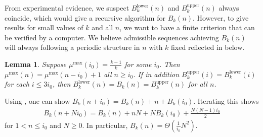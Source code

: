 \documentclass[11pt,reqno]{amsart}
\theoremstyle{plain}
\newtheorem{lemma}[theorem]{Lemma}
\theoremstyle{definition}
\theoremstyle{remark}
\numberwithin{equation}{section}
\numberwithin{equation}{section}
\newcommand{\up}{\textrm{upper}}
\newcommand{\low}{\textrm{lower}}
\begin{document}
From experimental evidence, we suspect $B_k^{\low}(n)$ and $B_k^{\up}(n)$ always coincide, which would give a recursive algorithm for $B_k(n)$. However, to give results for small values of $k$ and all $n$, we want to have a finite criterion that can be verified by a computer. We believe admissible sequences achieving $B_k(n)$ will always following a periodic structure in $n$ with $k$ fixed reflected in  below.
\begin{lemma}
\label{periodic}
Suppose $\mu^{\max}(i_0)=\frac{k-1}{k}$ for some $i_0$. Then $\mu^{\max}(n) = \mu^{\max}(n-i_0) + 1$ all $n\geq i_0$. If in addition $B_k^{\up}(i)=B_k^{\low}(i)$ for each $i\leq 3i_0$, then $B_k^{\low}(n)=B_k(n)=B_k^{\up}(n)$ for all $n$.
\end{lemma}

Using , one can show $B_k(n+i_0) = B_k(n)+n+B_k(i_0)$. Iterating this shows
\begin{align*}
     B_k(n+Ni_0) = B_k(n)+nN+NB_k(i_0) + \frac{N(N-1)i_0}{2}
\end{align*}
for $1<n\leq i_0$ and $N\geq 0$. In particular, $B_k(n)=\Theta(\frac{1}{i_0}N^2)$.
\end{document}
